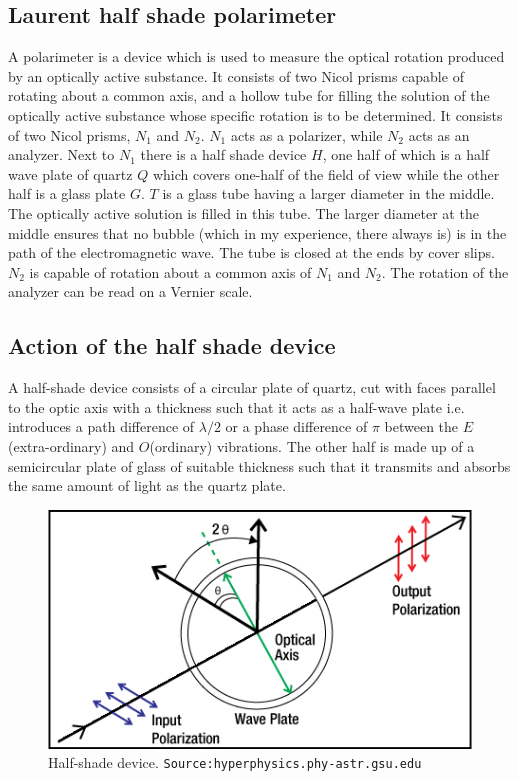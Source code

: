 \documentclass{dkpinto-report}
\begin{document}
\subsection{Laurent half shade polarimeter}
A polarimeter is a device which is used to measure the optical rotation produced by an optically active substance. It consists of two Nicol prisms capable of rotating about a common axis, and a hollow tube for filling the solution of the optically active substance whose specific rotation is to be determined. It consists of two Nicol prisms, $N_1$ and $N_2$. $N_1$ acts as a polarizer, while $N_2$ acts as an analyzer. Next to $N_1$ there is a half shade device $H$, one half of which is a half wave plate of quartz $Q$ which covers one-half of the field of view while the other half is a glass plate $G$. $T$ is a glass tube having a larger diameter in the middle. The optically active solution is filled in this tube. The larger diameter at the middle ensures that no bubble (which in my experience, there always is) is in the path of the electromagnetic wave. The tube is closed at the ends by cover slips. $N_2$ is capable of rotation about a common axis of $N_1$ and $N_2$. The rotation of the analyzer can be read on a Vernier scale.   

\subsection{Action of the half shade device}
A half-shade device consists of a circular plate of quartz, cut with faces parallel to the optic axis with a thickness such that it acts as a half-wave plate i.e. introduces a path difference of $\lambda / 2$ or a phase difference of $\pi$ between the $E$(extra-ordinary) and $O$(ordinary) vibrations. The other half is made up of a semicircular plate of glass of suitable thickness such that it transmits and absorbs the same amount of light as the quartz plate.

\begin{figure}
\centering
\caption{Half-shade device. \texttt{Source:hyperphysics.phy-astr.gsu.edu}}
\includegraphics[scale=0.4]{Images/half_plate.png}
\end{figure}
\end{document}
